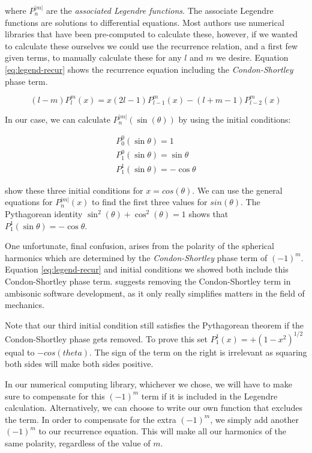 where $P_{n}^{|m|}$ are the \textit{associated Legendre functions}. The associate Legendre functions are solutions to differential equations. Most authors use numerical libraries that have been pre-computed to calculate these, however, if we wanted to calculate these ourselves we could use the recurrence relation, and a first few given terms, to manually calculate these for any $l$ and $m$ we desire. Equation \ref{eq:legend-recur} shows the recurrence equation including the \textit{Condon-Shortley} phase term.

\begin{equation}
(l-m) P_{l}^{m}(x)=x(2 l-1) P_{l-1}^{m}(x)-(l+m-1) P_{l-2}^{m}(x)
\label{eq:legend-recur}
\end{equation}

In our case, we can calculate $P_{n}^{|m|}(\sin (\theta))$ by using the initial conditions: 

\begin{equation}
\begin{array}{l}
P_{0}^{0}(\sin \theta)=1 \\
P_{1}^{0}(\sin \theta)=\sin \theta \\
P_{1}^{1}(\sin \theta)=-\cos \theta
\end{array}
\end{equation}

\cite{Associat51online} show these three initial conditions for $x = cos(\theta)$. We can use the general equations for $P_{n}^{|m|}(x)$ to find the first three values for $sin(\theta)$. The Pythagorean identity $\sin ^{2}(\theta)+\cos ^{2}(\theta)=1$ shows that $P_{1}^{1}(\sin \theta)=-\cos \theta$.

One unfortunate, final confusion, arises from the polarity of the spherical harmonics which are determined by the \textit{Condon-Shortley} phase term of $(-1)^m$. Equation \ref{eq:legend-recur} and initial conditions we showed both include this Condon-Shortley phase term. \cite{nachbar2011ambix} suggests removing the Condon-Shortley term in ambisonic software development, as it only really simplifies matters in the field of mechanics.

Note that our third initial condition still satisfies the Pythagorean theorem if the Condon-Shortley phase gets removed. To prove this set $P_{1}^{1}(x)=+\left(1-x^{2}\right)^{1 / 2}$ equal to $-cos(theta)$. The sign of the term on the right is irrelevant as squaring both sides will make both sides positive. 

In our numerical computing library, whichever we chose, we will have to make sure to compensate for this $(-1)^m$ term if it is included in the Legendre calculation. Alternatively, we can choose to write our own function that excludes the term. In order to compensate for the extra $(-1)^m$, we simply add another $(-1)^m$ to our recurrence equation. This will make all our harmonics of the same polarity, regardless of the value of $m$. 

